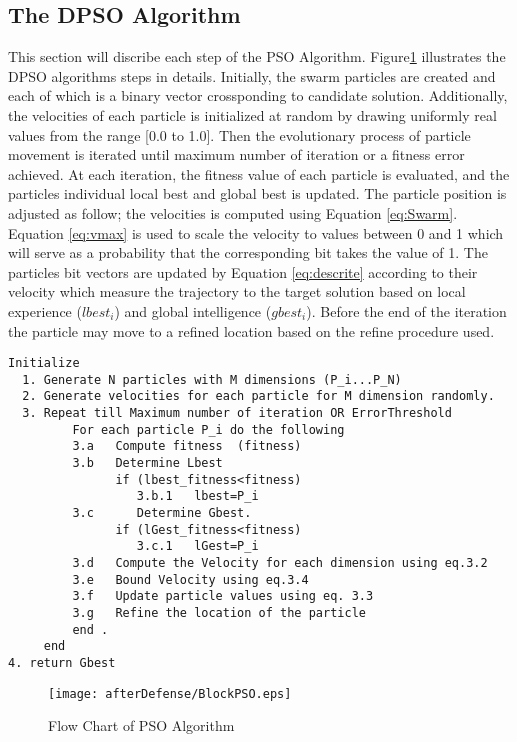 \subsection{The DPSO Algorithm}
\label{sec:ParticleSwarmAlgorithm} 

This section will discribe each step of the PSO Algorithm. Figure\ref{fig:BlockPSO} illustrates the DPSO algorithms steps in details. Initially, the swarm particles are created and each of which is a binary vector crossponding to candidate solution. Additionally, the velocities of each particle is initialized at random by drawing uniformly real values from the range [0.0 to 1.0]. Then the evolutionary process of particle movement is iterated until maximum number of iteration or a fitness error achieved. At each iteration,  the fitness value of each particle is evaluated, and the particles individual local best and global best is updated. The particle position is adjusted as follow; the velocities is computed using Equation \ref{eq:Swarm}. Equation \ref{eq:vmax} is used to scale the velocity to values between 0 and 1 which will serve as a probability that the corresponding bit takes the value of 1. The particles bit vectors are updated by Equation \ref{eq:descrite} according to their velocity which measure the trajectory to the target solution based on local experience ($lbest_{i}$) and global intelligence ($gbest_{i}$). Before the end of the iteration the particle may move to a refined location based on the refine procedure used. 

\begin{verbatim}
Initialize 
  1. Generate N particles with M dimensions (P_i...P_N) 
  2. Generate velocities for each particle for M dimension randomly. 
  3. Repeat till Maximum number of iteration OR ErrorThreshold  
         For each particle P_i do the following 
         3.a   Compute fitness  (fitness)
         3.b   Determine Lbest  
               if (lbest_fitness<fitness)
                  3.b.1   lbest=P_i
         3.c      Determine Gbest.
               if (lGest_fitness<fitness)
                  3.c.1   lGest=P_i
         3.d   Compute the Velocity for each dimension using eq.3.2 
         3.e   Bound Velocity using eq.3.4
         3.f   Update particle values using eq. 3.3
         3.g   Refine the location of the particle
         end .
     end 
4. return Gbest
\end{verbatim}
  
  
\begin{figure}
	\centering
		\texttt{[image: afterDefense/BlockPSO.eps]}
	\caption{Flow Chart of PSO Algorithm }
	\label{fig:BlockPSO}
\end{figure}